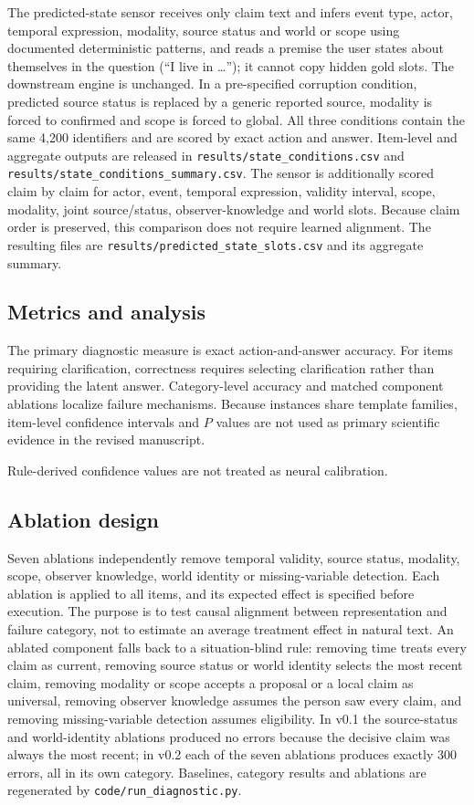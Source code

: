 The predicted-state sensor receives only claim text and infers event type,
actor, temporal expression, modality, source status and world or scope using
documented deterministic patterns, and reads a premise the user states about
themselves in the question (``I live in \ldots''); it cannot copy hidden gold
slots. The
downstream engine is unchanged. In a pre-specified corruption condition,
predicted source status is replaced by a generic reported source, modality is
forced to confirmed and scope is forced to global. All three conditions contain
the same 4,200 identifiers and are scored by exact action and answer. Item-level
and aggregate outputs are released in
\texttt{results/state\_conditions.csv} and
\texttt{results/state\_conditions\_summary.csv}.
The sensor is additionally scored claim by claim for actor, event, temporal
expression, validity interval, scope, modality, joint source/status,
observer-knowledge and world slots. Because claim order is preserved, this
comparison does not require learned alignment. The resulting files are
\texttt{results/predicted\_state\_slots.csv} and its aggregate summary.


\subsection*{Metrics and analysis}

The primary diagnostic measure is exact action-and-answer accuracy. For items
requiring clarification, correctness requires selecting clarification rather
than providing the latent answer. Category-level accuracy and matched component
ablations localize failure mechanisms. Because instances share template
families, item-level confidence intervals and $P$ values are not used as primary
scientific evidence in the revised manuscript.

Rule-derived confidence values are not treated as neural calibration.

\subsection*{Ablation design}

Seven ablations independently remove temporal validity, source status, modality,
scope, observer knowledge, world identity or missing-variable detection. Each
ablation is applied to all items, and its expected effect is specified before
execution. The purpose is to test causal alignment between representation and
failure category, not to estimate an average treatment effect in natural text.
An ablated component falls back to a situation-blind rule: removing time treats
every claim as current, removing source status or world identity selects the
most recent claim, removing modality or scope accepts a proposal or a local
claim as universal, removing observer knowledge assumes the person saw every
claim, and removing missing-variable detection assumes eligibility. In v0.1 the
source-status and world-identity ablations produced no errors because the
decisive claim was always the most recent; in v0.2 each of the seven ablations
produces exactly 300 errors, all in its own category. Baselines, category
results and ablations are regenerated by \texttt{code/run\_diagnostic.py}.

